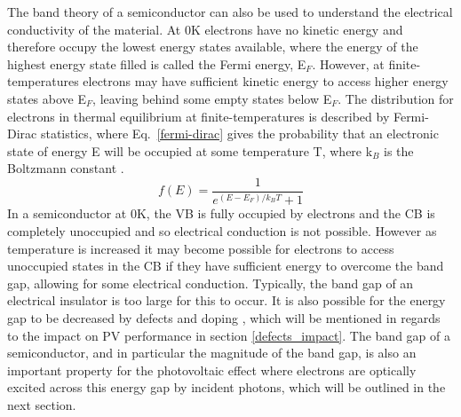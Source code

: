 \documentclass[11pt, twoside]{report}
\begin{document}

The band theory of a semiconductor can also be used to understand the electrical conductivity of the material. At 0K electrons have no kinetic energy and therefore occupy the lowest energy states available, where the energy of the highest energy state filled is called the Fermi energy, E$_F$. However, at finite-temperatures electrons may have sufficient kinetic energy to access higher energy states above E$_F$, leaving behind some empty states below E$_F$. The distribution for electrons in thermal equilibrium at finite-temperatures is described by Fermi-Dirac statistics, where Eq.~\ref{fermi-dirac} gives the probability that an electronic state of energy E will be occupied at some temperature T, where k$_B$ is the Boltzmann constant \cite{Nelson3}.
\begin{equation}\label{fermi-dirac}
f(E) = \frac{1}{e^{(E-E_F)/k_BT}+1}
\end{equation}
In a semiconductor at 0K, the VB is fully occupied by electrons and the CB is completely unoccupied and so electrical conduction is not possible. However as temperature is increased it may become possible for electrons to access unoccupied states in the CB if they have sufficient energy to overcome the band gap, allowing for some electrical conduction. Typically, the band gap of an electrical insulator is too large for this to occur. It is also possible for the energy gap to be decreased by defects and doping \cite{Nelson3}, which will be mentioned in regards to the impact on PV performance in section \ref{defects_impact}. The band gap of a semiconductor, and in particular the magnitude of the band gap, is also an important property for the photovoltaic effect where electrons are optically excited across this energy gap by incident photons, which will be outlined in the next section.

\end{document}
